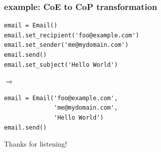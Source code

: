 \documentclass[aspectratio=169,12pt,xcolor=dvipsnames]{beamer}
\begin{document}
\begin{frame}[fragile]
  \frametitle{example: CoE to CoP transformation}
  \begin{center}
    \begin{minipage}[c]{.512\textwidth}
      \begin{verbatim}
email = Email()
email.set_recipient('foo@example.com')
email.set_sender('me@mydomain.com')
email.send()
email.set_subject('Hello World')
        \end{verbatim}
      \end{minipage}
      \begin{minipage}[c]{.03\textwidth}
        \begin{large}
          $\Rightarrow$
        \end{large}
      \end{minipage}
      \begin{minipage}[c]{.428\textwidth}
        \begin{verbatim}
email = Email('foo@example.com',
              'me@mydomain.com',
              'Hello World')
email.send()
        \end{verbatim}
      \end{minipage}
    \end{center}
\end{frame}

\begin{frame}
  \begin{center}
    \begin{huge}
      Thanks for listening!
    \end{huge}
  \end{center}
\end{frame}
\end{document}
